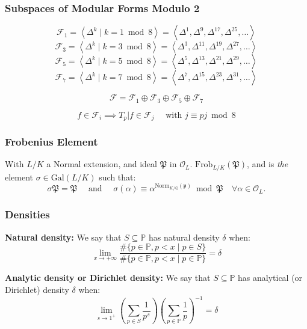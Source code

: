 \begin{frame}
	\frametitle{Subspaces of Modular Forms Modulo 2}
	$$
	\mathcal{F}_1
	= \left\langle \Delta^k \mid k = 1 \bmod 8 \right\rangle
	= \left\langle \Delta^1, \Delta^9, \Delta^{17}, \Delta^{25}, \dots \right\rangle
	$$
	$$
	\mathcal{F}_3
	= \left\langle \Delta^k \mid k = 3 \bmod 8 \right\rangle
	= \left\langle \Delta^3, \Delta^{11}, \Delta^{19}, \Delta^{27}, \dots \right\rangle
	$$
	$$
	\mathcal{F}_5
	= \left\langle \Delta^k \mid k = 5 \bmod 8 \right\rangle
	= \left\langle \Delta^5, \Delta^{13}, \Delta^{21}, \Delta^{29}, \dots \right\rangle
	$$
	$$
	\mathcal{F}_7
	= \left\langle \Delta^k \mid k = 7 \bmod 8 \right\rangle
	= \left\langle \Delta^7, \Delta^{15}, \Delta^{23}, \Delta^{31}, \dots \right\rangle
	$$
	
	$$
	\mathcal{F} = \mathcal{F}_1 \oplus \mathcal{F}_3 \oplus \mathcal{F}_5 \oplus \mathcal{F}_7
	$$
	
	\vspace{0.25cm}
	
	$$
	f \in \mathcal{F}_i \implies T_p|f \in \mathcal{F}_j
	\quad \text{ with } j \equiv pj \bmod 8
	$$
	
	\vspace{1cm}
\end{frame}

\begin{frame}
	\frametitle{Frobenius Element}
	With $L/K$ a Normal extension, and ideal $\mathfrak{P}$ in $\mathcal{O}_L$.
	$\text{Frob}_{L/K}(\mathfrak{P})$, and is \textit{the} element $\sigma \in \text{Gal}(L/K)$ such that:
	$$
	\sigma \mathfrak{P} = \mathfrak{P}
	\quad \text{ and } \quad
	\sigma(\alpha) \equiv \alpha^{\text{Norm}_{K/\mathbb{Q}}(\mathfrak{p})} \bmod{\mathfrak{P}} \quad \forall \alpha \in \mathcal{O}_L.
	$$
\end{frame}

\begin{frame}
	\frametitle{Densities}
	\textbf{Natural density:}
	We say that $S \subseteq \mathbb{P}$ has natural density $\delta$ when:
	$$
	\lim_{x \to +\infty}
	\frac{ \# \{ p \in \mathbb{P}, p < x \mid p \in S \}}
	{ \# \{ p \in \mathbb{P}, p < x \mid p \in \mathbb{P} \}} = \delta
	$$
	
	\vspace{0.5cm}
	
	\textbf{Analytic density or Dirichlet density:}
	We say that $S \subseteq \mathbb{P}$ has analytical (or Dirichlet) density $\delta$ when:
	$$
	\lim_{s \to 1^+}
	\left( \sum_{p \in S} \frac{1}{p^s} \right) 
	\left( \sum_{p \in \mathbb{P}} \frac{1}{p} \right)^{-1} = \delta
	$$
\end{frame}

